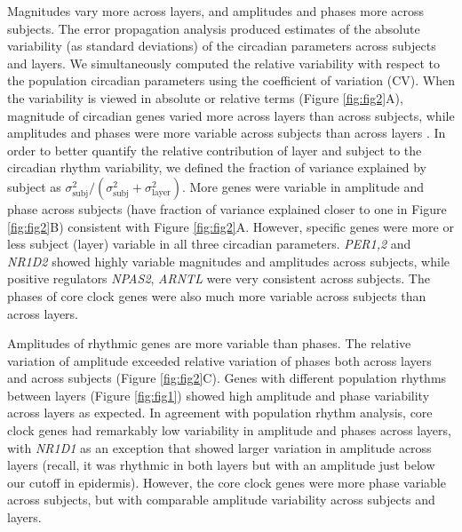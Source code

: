 Magnitudes vary more across layers, and amplitudes and phases more across subjects. The error propagation analysis produced estimates of the absolute variability (as standard deviations) of the circadian parameters across subjects and layers. We simultaneously computed the relative variability with respect to the population circadian parameters using the coefficient of variation (CV). When the variability is viewed in absolute or relative terms (Figure \ref{fig:fig2}A), magnitude of circadian genes varied more across layers than across subjects, while amplitudes and phases were more variable across subjects than across layers . In order to better quantify the relative contribution of layer and subject to the circadian rhythm variability, we defined the fraction of variance explained by subject as $\sigma^2_\textrm{subj}/(\sigma^2_\textrm{subj} + \sigma^2_\textrm{layer})$. More genes were variable in amplitude and phase across subjects (have fraction of variance explained closer to one in Figure \ref{fig:fig2}B) consistent with Figure \ref{fig:fig2}A. However, specific genes were more or less subject (layer) variable in all three circadian parameters. \textit{PER1,2} and \textit{NR1D2} showed highly variable magnitudes and amplitudes across subjects, while positive regulators \textit{NPAS2}, \textit{ARNTL} were very consistent across subjects. The phases of core clock genes were also much more variable across subjects than across layers.

Amplitudes of rhythmic genes are more variable than phases. The relative variation of amplitude exceeded relative variation of phases both across layers and across subjects (Figure \ref{fig:fig2}C). Genes with different population rhythms between layers (Figure \ref{fig:fig1}) showed high amplitude and phase variability across layers as expected. In agreement with population rhythm analysis, core clock genes had remarkably low variability in amplitude and phases across layers, with \textit{NR1D1} as an exception that showed larger variation in amplitude across layers (recall, it was rhythmic in both layers but with an amplitude just below our cutoff in epidermis). However, the core clock genes were more phase variable across subjects, but with comparable amplitude variability across subjects and layers. 

